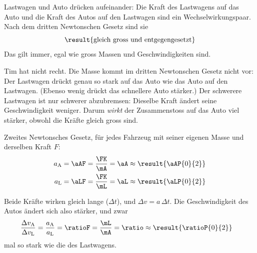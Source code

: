 \begin{abcliste}
\abc
Lastwagen und Auto drücken aufeinander: Die Kraft des Lastwagens auf das Auto und die Kraft des Autos auf den Lastwagen sind ein Wechselwirkungspaar. Nach dem dritten Newtonschen Gesetz sind sie
\[
 \result{\text{gleich gross und entgegengesetzt}}
\]
Das gilt immer, egal wie gross Massen und Geschwindigkeiten sind.

\abc
Tim hat nicht recht. Die Masse kommt im dritten Newtonschen Gesetz nicht vor: Der Lastwagen drückt genau so stark auf das Auto wie das Auto auf den Lastwagen. (Ebenso wenig drückt das schnellere Auto stärker.) Der schwerere Lastwagen ist nur schwerer abzubremsen: Dieselbe Kraft ändert seine Geschwindigkeit weniger. Darum \emph{wirkt} der Zusammenstoss auf das Auto viel stärker, obwohl die Kräfte gleich gross sind.

\abc
Zweites Newtonsches Gesetz, für jedes Fahrzeug mit seiner eigenen Masse und derselben Kraft $F$:
\begin{align}
 a_\mathrm{A} &= \aAF = \frac{\FK}{\mA} = \aA \approx \result{\aAP{0}{2}} \\
 a_\mathrm{L} &= \aLF = \frac{\FK}{\mL} = \aL \approx \result{\aLP{0}{2}}
\end{align}

\abc
Beide Kräfte wirken gleich lange ($\Delta t$), und $\Delta v = a\,\Delta t$. Die Geschwindigkeit des Autos ändert sich also stärker, und zwar
\begin{align}
 \frac{\Delta v_\mathrm{A}}{\Delta v_\mathrm{L}} &= \frac{a_\mathrm{A}}{a_\mathrm{L}} = \ratioF = \frac{\mL}{\mA} = \ratio \approx \result{\ratioP{0}{2}}
\end{align}
mal so stark wie die des Lastwagens.
\end{abcliste}
